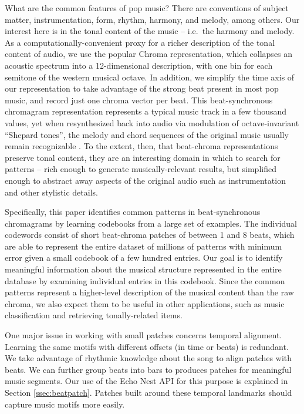 \documentclass{article}
\newcommand{\ie}{i.e.~}
\begin{document}
What are the common features of pop music?  There are conventions
of subject matter, instrumentation, form, rhythm, harmony, and melody, among
others.  Our interest here is in the tonal content of the music -- \ie the
harmony and melody.  As a computationally-convenient proxy for a richer
description of the tonal content of audio, we use the popular Chroma
representation, which collapses an acoustic spectrum into a 12-dimensional
description, with one bin for each semitone of the western musical octave.
In addition, we simplify the time axis of our representation to take advantage
of the strong beat present in most pop music, and record just one
chroma vector per beat.  This beat-synchronous chromagram
representation represents a typical music track
in a few thousand values, yet when resynthesized back into audio via
modulation of octave-invariant ``Shepard tones'', the melody and
chord sequences of the original music usually remain recognizable
\cite{Ellis2007a}.  To the extent, then, that beat-chroma
representations preserve tonal content, they
are an interesting domain in which to search for patterns -- rich enough
to generate musically-relevant results, but simplified enough to
abstract away aspects of the original audio such as
instrumentation and other stylistic details.

Specifically, this paper identifies common patterns in beat-synchronous
chromagrams by learning codebooks from a large set of examples.
The individual codewords consist of short beat-chroma patches of
between 1 and 8 beats, which are able to represent the entire dataset
of millions of patterns with minimum error given a small codebook of
a few hundred entries.  Our goal is to identify meaningful information
about the musical structure represented in the entire database by
examining individual entries in this codebook.  Since the common
patterns represent a higher-level description of the musical content
than the raw chroma,
we also expect them to be useful in other applications, such as
music classification and retrieving tonally-related items.

One major issue in working with small patches concerns temporal
alignment. Learning the same motifs with different offsets 
(in time or beats) is redundant. We take advantage
of rhythmic knowledge about the song to align patches with beats.
We can further group beats into bars to produces patches
for meaningful music segments.
Our use of the Echo Nest API \cite{EchoNest} for this purpose is 
explained in Section \ref{ssec:beatpatch}. Patches built around
these temporal landmarks should capture music motifs more easily.
\end{document}
